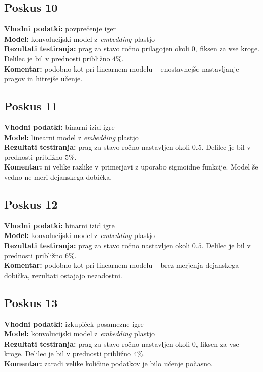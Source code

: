 \documentclass[a4paper,12pt]{article}
\begin{document}
\subsection{Poskus 10}
\textbf{Vhodni podatki:} povprečenje iger \\
\textbf{Model:} konvolucijski model z \textit{embedding} plastjo \\
\textbf{Rezultati testiranja:} prag za stavo ročno prilagojen okoli $0$, fiksen za vse kroge. Delilec je bil v prednosti približno $4\%$. \\
\textbf{Komentar:} podobno kot pri linearnem modelu – enostavnejše nastavljanje pragov in hitrejše učenje.

\subsection{Poskus 11}
\textbf{Vhodni podatki:} binarni izid igre \\
\textbf{Model:} linearni model z \textit{embedding} plastjo \\
\textbf{Rezultati testiranja:} prag za stavo ročno nastavljen okoli $0.5$. Delilec je bil v prednosti približno $5\%$. \\
\textbf{Komentar:} ni velike razlike v primerjavi z uporabo sigmoidne funkcije. Model še vedno ne meri dejanskega dobička.

\subsection{Poskus 12}
\textbf{Vhodni podatki:} binarni izid igre \\
\textbf{Model:} konvolucijski model z \textit{embedding} plastjo \\
\textbf{Rezultati testiranja:} prag za stavo ročno nastavljen okoli $0.5$. Delilec je bil v prednosti približno $6\%$. \\
\textbf{Komentar:} podobno kot pri linearnem modelu – brez merjenja dejanskega dobička, rezultati ostajajo nezadostni.

\subsection{Poskus 13}
\textbf{Vhodni podatki:} izkupiček posamezne igre \\
\textbf{Model:} konvolucijski model z \textit{embedding} plastjo \\
\textbf{Rezultati testiranja:} prag za stavo ročno nastavljen okoli $0$, fiksen za vse kroge. Delilec je bil v prednosti približno $4\%$. \\
\textbf{Komentar:} zaradi velike količine podatkov je bilo učenje počasno.
\end{document}
